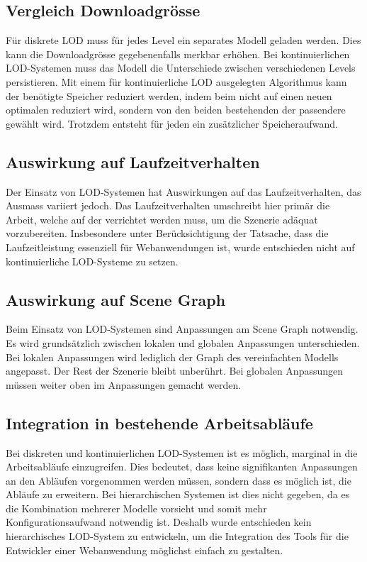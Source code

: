 \subsection{Vergleich Downloadgrösse}

Für diskrete LOD muss für jedes Level ein separates Modell geladen werden. Dies kann die Downloadgrösse gegebenenfalls merkbar erhöhen. Bei kontinuierlichen LOD-Systemen muss das Modell die Unterschiede zwischen verschiedenen Levels persistieren. Mit einem für kontinuierliche LOD ausgelegten Algorithmus kann der benötigte Speicher reduziert werden, indem beim  nicht auf einen neuen optimalen  reduziert wird, sondern von den beiden bestehenden  der passendere gewählt wird. Trotzdem entsteht für jeden  ein zusätzlicher Speicheraufwand.

\subsection{Auswirkung auf Laufzeitverhalten}

Der Einsatz von LOD-Systemen hat Auswirkungen auf das Laufzeitverhalten, das Ausmass variiert jedoch. Das Laufzeitverhalten umschreibt hier primär die Arbeit, welche auf der  verrichtet werden muss, um die Szenerie adäquat vorzubereiten.
Insbesondere unter Berücksichtigung der Tatsache, dass die Laufzeitleistung essenziell für Webanwendungen ist, wurde entschieden nicht auf kontinuierliche LOD-Systeme zu setzen.

\subsection{Auswirkung auf Scene Graph}
Beim Einsatz von LOD-Systemen sind Anpassungen am \gls{Scene Graph} notwendig. Es wird grundsätzlich zwischen lokalen und globalen Anpassungen unterschieden. Bei lokalen Anpassungen wird lediglich der Graph des vereinfachten Modells angepasst. Der Rest der Szenerie bleibt unberührt. Bei globalen Anpassungen müssen weiter oben im  Anpassungen gemacht werden.

\subsection{Integration in bestehende Arbeitsabläufe}

Bei diskreten und kontinuierlichen LOD-Systemen ist es möglich, marginal in die Arbeitsabläufe einzugreifen. Dies bedeutet, dass keine signifikanten Anpassungen an den Abläufen vorgenommen werden müssen, sondern dass es möglich ist, die Abläufe zu erweitern.
Bei hierarchischen Systemen ist dies nicht gegeben, da es die Kombination mehrerer Modelle vorsieht und somit mehr Konfigurationsaufwand notwendig ist.
Deshalb wurde entschieden kein hierarchisches LOD-System zu entwickeln, um die Integration des Tools für die Entwickler einer Webanwendung möglichst einfach zu gestalten.

